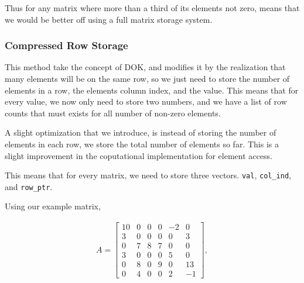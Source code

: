 \documentclass[../fem.tex]{subfiles}
\begin{document}
Thus for any matrix where more than a third of its elements not zero, means
that we would be better off using a full matrix storage system.

\begin{Figure}
  \begin{center}
  \end{center}
  \label{fig:mat_dok}
\end{Figure}

\subsubsection{Compressed Row Storage}%
\label{ssub:compressed_row_storage}

This method take the concept of DOK, and modifies it by the realization that
many elements will be on the same row, so we just need to store the number of
elements in a row, the elements column index, and the value. This means that
for every value, we now only need to store two numbers, and we have a list of
row counts that must exists for all number of non-zero elements.

A slight optimization that we introduce, is instead of storing the number of
elements in each row, we store the total number of elements so far. This is a
slight improvement in the coputational implementation for element access.

This means that for every matrix, we need to store three vectors.
\texttt{val}, \texttt{col_ind}, and
\texttt{row_ptr}.

Using our example matrix,

\begin{align*}
  A = \begin{bmatrix}
    10 & 0 & 0 & 0 & -2 & 0 \\
    3 & 0 & 0 & 0 & 0 & 3 \\
    0 & 7 & 8 & 7 & 0 & 0 \\
    3 & 0 & 0 & 0 & 5 & 0 \\
    0 & 8 & 0 & 9 & 0 & 13 \\
    0 & 4 & 0 & 0 & 2 & -1
  \end{bmatrix},
\end{align*}
\end{document}
